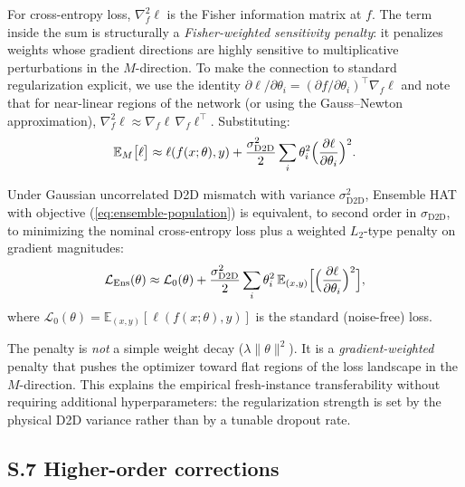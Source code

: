 For cross-entropy loss, $\nabla_f^2 \ell$ is the Fisher information matrix at $f$. The term inside the sum is structurally a \emph{Fisher-weighted sensitivity penalty}: it penalizes weights whose gradient directions are highly sensitive to multiplicative perturbations in the $M$-direction. To make the connection to standard regularization explicit, we use the identity $\partial \ell / \partial \theta_i = (\partial f / \partial \theta_i)^{\top} \nabla_f \ell$ and note that for near-linear regions of the network (or using the Gauss--Newton approximation), $\nabla_f^2 \ell \approx \nabla_f \ell \, \nabla_f \ell^{\top}$. Substituting:
\begin{equation}
    \mathbb{E}_M\bigl[\ell\bigr] \approx \ell(f(x;\theta), y) + \frac{\sigma_{\text{D2D}}^2}{2} \sum_i \theta_i^2 \Bigl(\frac{\partial \ell}{\partial \theta_i}\Bigr)^2.
    \label{eq:implicit-regularizer-grad-l2}
\end{equation}

\begin{proposition}
    Under Gaussian uncorrelated D2D mismatch with variance $\sigma_{\text{D2D}}^2$, Ensemble HAT with objective (\ref{eq:ensemble-population}) is equivalent, to second order in $\sigma_{\text{D2D}}$, to minimizing the nominal cross-entropy loss plus a weighted $L_2$-type penalty on gradient magnitudes:
    \begin{equation}
        \mathcal{L}_{\text{Ens}}(\theta) \approx \mathcal{L}_0(\theta) + \frac{\sigma_{\text{D2D}}^2}{2} \sum_i \theta_i^2 \, \mathbb{E}_{(x,y)}\Bigl[\Bigl(\frac{\partial \ell}{\partial \theta_i}\Bigr)^2\Bigr],
        \label{eq:main-result}
    \end{equation}
    where $\mathcal{L}_0(\theta) = \mathbb{E}_{(x,y)}[\ell(f(x;\theta),y)]$ is the standard (noise-free) loss.
\end{proposition}

\begin{remark}
    The penalty is \emph{not} a simple weight decay ($\lambda \|\theta\|^2$). It is a \emph{gradient-weighted} penalty that pushes the optimizer toward flat regions of the loss landscape in the $M$-direction. This explains the empirical fresh-instance transferability without requiring additional hyperparameters: the regularization strength is set by the physical D2D variance rather than by a tunable dropout rate.
\end{remark}

\subsection*{S.7 Higher-order corrections}

